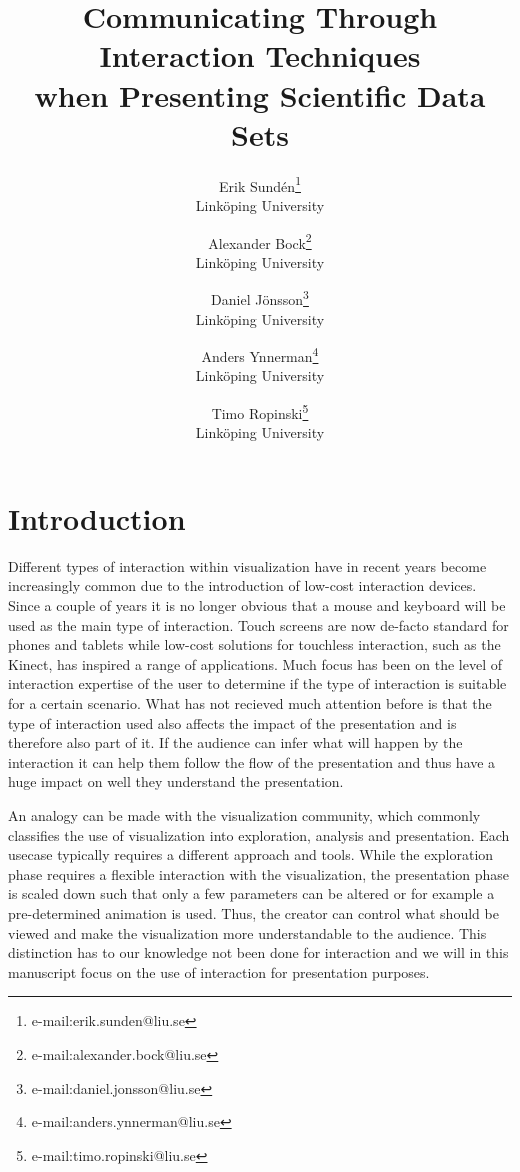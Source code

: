 \documentclass[review,journal]{vgtc}         %
\title{Communicating Through Interaction Techniques\\when Presenting Scientific Data Sets} %
\author{Erik Sund\'en\thanks{e-mail:erik.sunden@liu.se}\\ %
        \scriptsize Link{\"o}ping University %
\and Alexander Bock\thanks{e-mail:alexander.bock@liu.se}\\ %
			   \scriptsize Link{\"o}ping University %
\and Daniel J\"onsson\thanks{e-mail:daniel.jonsson@liu.se}\\ %
          \scriptsize Link{\"o}ping University %
\and Anders Ynnerman\thanks{e-mail:anders.ynnerman@liu.se}\\ %
          \scriptsize Link{\"o}ping University %
\and Timo Ropinski\thanks{e-mail:timo.ropinski@liu.se}\\ %
           \scriptsize Link{\"o}ping University }
\begin{document}

\maketitle

\section{Introduction}\label{sec:introduction}
Different types of interaction within visualization have in recent years become increasingly common due to the introduction of low-cost interaction devices.
Since a couple of years it is no longer obvious that a mouse and keyboard will be used as the main type of interaction. 
Touch screens are now de-facto standard for phones and tablets while low-cost solutions for touchless interaction, such as the Kinect, has inspired a range of applications. 
Much focus has been on the level of interaction expertise of the user to determine if the type of interaction is suitable for a certain scenario. What has not recieved much attention before is that the type of interaction used also affects the impact of the presentation and is therefore also part of it. If the audience can infer what will happen by the interaction it can help them follow the flow of the presentation and thus have a huge impact on well they understand the presentation.

An analogy can be made with the visualization community, which commonly classifies the use of visualization into exploration, analysis and presentation. Each usecase typically requires a different approach and tools. 
While the exploration phase requires a flexible interaction with the visualization, the presentation phase is scaled down such that only a few parameters can be altered or for example a pre-determined animation is used. Thus, the creator can control what should be viewed and make the visualization more understandable to the audience.
This distinction has to our knowledge not been done for interaction and we will in this manuscript focus on the use of interaction for presentation purposes.
\end{document}
